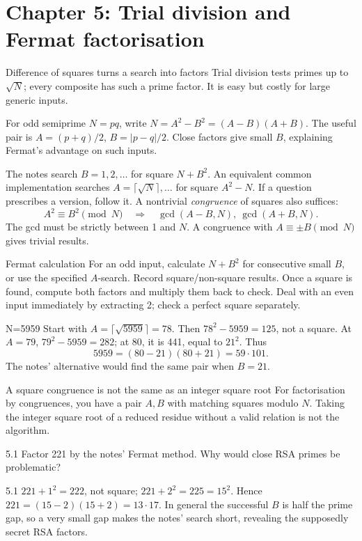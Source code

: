 \documentclass[11pt,a4paper]{article}
\begin{document}
\section{Chapter 5: Trial division and Fermat factorisation}
\begin{concept}{Difference of squares turns a search into factors}
Trial division tests primes up to \(\sqrt N\); every composite has such a prime factor. It is easy but costly for large generic inputs.

For odd semiprime \(N=pq\), write \(N=A^2-B^2=(A-B)(A+B)\). The useful pair is \(A=(p+q)/2\), \(B=|p-q|/2\). Close factors give small \(B\), explaining Fermat's advantage on such inputs.

The notes search \(B=1,2,\ldots\) for square \(N+B^2\). An equivalent common implementation searches \(A=\lceil\sqrt N\rceil,\ldots\) for square \(A^2-N\). If a question prescribes a version, follow it. A nontrivial \emph{congruence} of squares also suffices:
\[A^2\equiv B^2\pmod N\quad\Longrightarrow\quad \gcd(A-B,N),\ \gcd(A+B,N).\]
The gcd must be strictly between 1 and \(N\). A congruence with \(A\equiv\pm B\pmod N\) gives trivial results.
\end{concept}
\begin{method}{Fermat calculation}
For an odd input, calculate \(N+B^2\) for consecutive small \(B\), or use the specified \(A\)-search. Record square/non-square results. Once a square is found, compute both factors and multiply them back to check. Deal with an even input immediately by extracting 2; check a perfect square separately.
\end{method}
\begin{example}{N=5959}
Start with \(A=\lceil\sqrt{5959}\rceil=78\). Then \(78^2-5959=125\), not a square. At \(A=79\), \(79^2-5959=282\); at \(80\), it is 441, equal to \(21^2\). Thus
\[5959=(80-21)(80+21)=59\cdot101.\]
The notes' alternative would find the same pair when \(B=21\).
\end{example}
\begin{tip}{A square congruence is not the same as an integer square root}
For factorisation by congruences, you have a pair \(A,B\) with matching squares modulo \(N\). Taking the integer square root of a reduced residue without a valid relation is not the algorithm.
\end{tip}
\begin{question}{5.1}
Factor 221 by the notes' Fermat method. Why would close RSA primes be problematic?
\end{question}
\begin{answer}{5.1}
\(221+1^2=222\), not square; \(221+2^2=225=15^2\). Hence \(221=(15-2)(15+2)=13\cdot17\). In general the successful \(B\) is half the prime gap, so a very small gap makes the notes' search short, revealing the supposedly secret RSA factors.
\end{answer}
\end{document}
